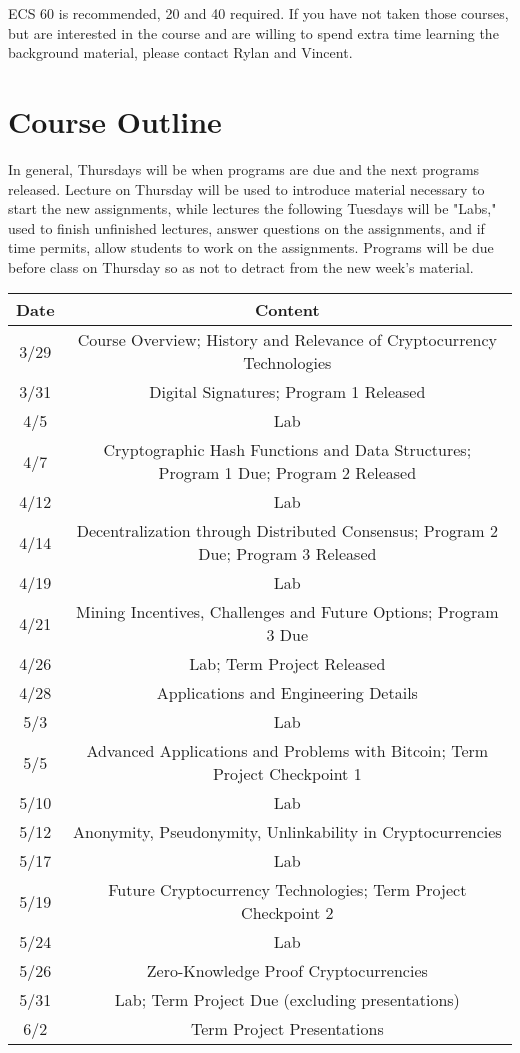 \documentclass{article}
\begin{document}
ECS 60 is recommended, 20 and 40 required. If you have not taken those courses, but are interested in the course and are willing to spend extra time learning the background material, please contact Rylan and Vincent.

\pagebreak

\section*{Course Outline}

In general, Thursdays will be when programs are due and the next programs released. Lecture on Thursday will be used to introduce material necessary to start the new assignments, while lectures the following Tuesdays will be "Labs," used to finish unfinished lectures, answer questions on the assignments, and if time permits, allow students to work on the assignments. Programs will be due before class on Thursday so as not to detract from the new week's material.\newline

\begin{tabularx}{\textwidth}{c|c}
\hline
Date & Content\\
\hline
3/29 & Course Overview; History and Relevance of Cryptocurrency Technologies\\
3/31 & Digital Signatures; Program 1 Released\\
4/5 & Lab\\
4/7 & Cryptographic Hash Functions and Data Structures; Program 1 Due; Program 2 Released\\
4/12 & Lab\\
4/14 & Decentralization through Distributed Consensus; Program 2 Due; Program 3 Released\\
4/19 & Lab\\
4/21 & Mining Incentives, Challenges and Future Options; Program 3 Due\\
4/26 & Lab; Term Project Released\\
4/28 & Applications and Engineering Details\\
5/3 & Lab\\
5/5 & Advanced Applications and Problems with Bitcoin; Term Project Checkpoint 1\\
5/10 & Lab\\
5/12 & Anonymity, Pseudonymity, Unlinkability in Cryptocurrencies\\
5/17 & Lab\\
5/19 & Future Cryptocurrency Technologies; Term Project Checkpoint 2\\
5/24 & Lab\\
5/26 & Zero-Knowledge Proof Cryptocurrencies\\
5/31 & Lab; Term Project Due (excluding presentations)\\
6/2 & Term Project Presentations\\

\end{tabularx}
\end{document}

